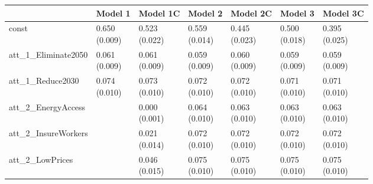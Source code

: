 \begin{tabular}{lllllll}
\toprule
  & Model 1 & Model 1C & Model 2 & Model 2C & Model 3 & Model 3C \\
\midrule
const & \makecell{ 0.650 \\ (0.009) } & \makecell{ 0.523 \\ (0.022) } & \makecell{ 0.559 \\ (0.014) } & \makecell{ 0.445 \\ (0.023) } & \makecell{ 0.500 \\ (0.018) } & \makecell{ 0.395 \\ (0.025) } \\
att_1_Eliminate2050 & \makecell{ 0.061 \\ (0.009) } & \makecell{ 0.061 \\ (0.009) } & \makecell{ 0.059 \\ (0.009) } & \makecell{ 0.060 \\ (0.009) } & \makecell{ 0.059 \\ (0.009) } & \makecell{ 0.059 \\ (0.009) } \\
att_1_Reduce2030 & \makecell{ 0.074 \\ (0.010) } & \makecell{ 0.073 \\ (0.010) } & \makecell{ 0.072 \\ (0.010) } & \makecell{ 0.072 \\ (0.010) } & \makecell{ 0.071 \\ (0.010) } & \makecell{ 0.071 \\ (0.010) } \\
att_2_EnergyAccess &   & \makecell{ 0.000 \\ (0.001) } & \makecell{ 0.064 \\ (0.010) } & \makecell{ 0.063 \\ (0.010) } & \makecell{ 0.063 \\ (0.010) } & \makecell{ 0.063 \\ (0.010) } \\
att_2_InsureWorkers &   & \makecell{ 0.021 \\ (0.014) } & \makecell{ 0.072 \\ (0.010) } & \makecell{ 0.072 \\ (0.010) } & \makecell{ 0.072 \\ (0.010) } & \makecell{ 0.072 \\ (0.010) } \\
att_2_LowPrices &   & \makecell{ 0.046 \\ (0.015) } & \makecell{ 0.075 \\ (0.010) } & \makecell{ 0.075 \\ (0.010) } & \makecell{ 0.075 \\ (0.010) } & \makecell{ 0.075 \\ (0.010) } \\

\end{tabular}
